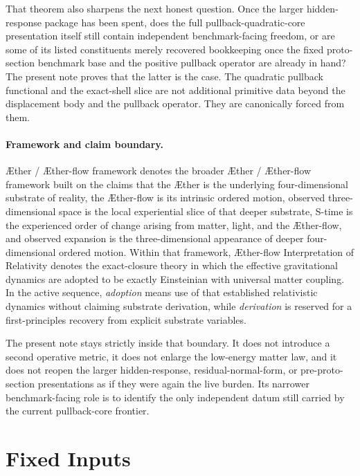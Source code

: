 \documentclass[11pt]{article}
\newcommand{\Aether}{\AE{}ther}
\newcommand{\Aflow}{\AE{}ther-flow}
\newcommand{\TheoryName}{\Aflow{} Interpretation of Relativity}
\newcommand{\TheoryProgram}{\Aether{} / \Aflow{} framework}
\begin{document}
That theorem also sharpens the next honest question. Once the larger hidden-response package has been spent, does the full pullback-quadratic-core presentation itself still contain independent benchmark-facing freedom, or are some of its listed constituents merely recovered bookkeeping once the fixed proto-section benchmark base and the positive pullback operator are already in hand? The present note proves that the latter is the case. The quadratic pullback functional and the exact-shell slice are not additional primitive data beyond the displacement body and the pullback operator. They are canonically forced from them.

\paragraph{Framework and claim boundary.}
\TheoryProgram{} denotes the broader \Aether{} / \Aflow{} framework built on the claims that the \Aether{} is the underlying four-dimensional substrate of reality, the \Aflow{} is its intrinsic ordered motion, observed three-dimensional space is the local experiential slice of that deeper substrate, S-time is the experienced order of change arising from matter, light, and the \Aflow{}, and observed expansion is the three-dimensional appearance of deeper four-dimensional ordered motion. Within that framework, \TheoryName{} denotes the exact-closure theory in which the effective gravitational dynamics are adopted to be exactly Einsteinian with universal matter coupling. In the active sequence, \emph{adoption} means use of that established relativistic dynamics without claiming substrate derivation, while \emph{derivation} is reserved for a first-principles recovery from explicit substrate variables.

The present note stays strictly inside that boundary. It does not introduce a second operative metric, it does not enlarge the low-energy matter law, and it does not reopen the larger hidden-response, residual-normal-form, or pre-proto-section presentations as if they were again the live burden. Its narrower benchmark-facing role is to identify the only independent datum still carried by the current pullback-core frontier.

\section{Fixed Inputs}
\end{document}
